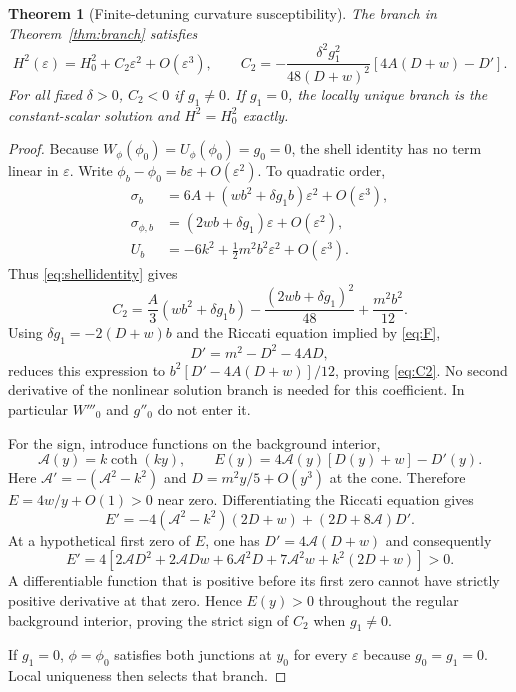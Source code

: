 \documentclass[11pt]{article}
\newtheorem{theorem}{Theorem}
\newcommand{\eps}{\varepsilon}
\begin{document}
\begin{theorem}[Finite-detuning curvature susceptibility]\label{thm:response}
The branch in Theorem~\ref{thm:branch} satisfies
\begin{equation}
H^2(\eps)=H_0^2+C_2\eps^2+O(\eps^3),\qquad
\boxed{C_2=-\frac{\delta^2g_1^2}{48(D+w)^2}
\left[4A(D+w)-D'\right].}\label{eq:C2}
\end{equation}
For all fixed $\delta>0$, $C_2<0$ if $g_1\ne0$. If $g_1=0$, the locally unique branch is the constant-scalar solution and $H^2=H_0^2$ exactly.
\end{theorem}
\begin{proof}
Because $W_\phi(\phi_0)=U_\phi(\phi_0)=g_0=0$, the shell identity has no term linear in $\eps$. Write $\phi_b-\phi_0=b\eps+O(\eps^2)$. To quadratic order,
\begin{align}
\sigma_b&=6A+(wb^2+\delta g_1b)\eps^2+O(\eps^3),\nonumber\\
\sigma_{\phi,b}&=(2wb+\delta g_1)\eps+O(\eps^2),\nonumber\\
U_b&=-6k^2+\tfrac12 m^2b^2\eps^2+O(\eps^3).
\end{align}
Thus \eqref{eq:shellidentity} gives
\begin{equation}
C_2=\frac{A}{3}(wb^2+\delta g_1b)
-\frac{(2wb+\delta g_1)^2}{48}+\frac{m^2b^2}{12}.
\end{equation}
Using $\delta g_1=-2(D+w)b$ and the Riccati equation implied by \eqref{eq:F},
\begin{equation}
D'=m^2-D^2-4AD,\label{eq:riccati}
\end{equation}
reduces this expression to $b^2[D'-4A(D+w)]/12$, proving \eqref{eq:C2}. No second derivative of the nonlinear solution branch is needed for this coefficient. In particular $W'''_0$ and $g''_0$ do not enter it.

For the sign, introduce functions on the background interior,
\begin{equation}
\mathcal A(y)=k\coth(ky),\qquad
E(y)=4\mathcal A(y)[D(y)+w]-D'(y).
\end{equation}
Here $\mathcal A'=-(\mathcal A^2-k^2)$ and
$D=m^2y/5+O(y^3)$ at the cone. Therefore $E=4w/y+O(1)>0$ near zero. Differentiating the Riccati equation gives
\begin{equation}
E'=-4(\mathcal A^2-k^2)(2D+w)+(2D+8\mathcal A)D'.
\end{equation}
At a hypothetical first zero of $E$, one has $D'=4\mathcal A(D+w)$ and consequently
\begin{equation}
E'=4\left[
2\mathcal A D^2+2\mathcal A Dw+6\mathcal A^2D
+7\mathcal A^2w+k^2(2D+w)\right]>0.\label{eq:barrier}
\end{equation}
A differentiable function that is positive before its first zero cannot have strictly positive derivative at that zero. Hence $E(y)>0$ throughout the regular background interior, proving the strict sign of $C_2$ when $g_1\ne0$.

If $g_1=0$, $\phi=\phi_0$ satisfies both junctions at $y_0$ for every $\eps$ because $g_0=g_1=0$. Local uniqueness then selects that branch.
\end{proof}
\end{document}
